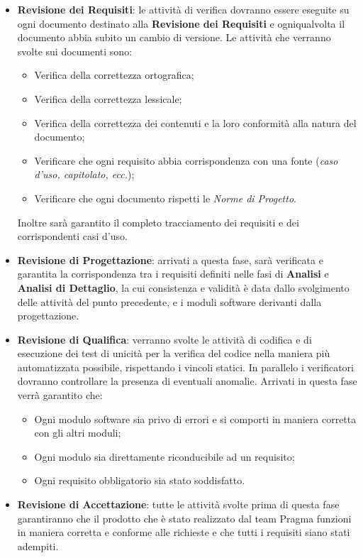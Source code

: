 \begin{itemize}
\item \textbf{Revisione dei Requisiti}: le attività di verifica dovranno essere eseguite su ogni documento destinato alla \textbf{Revisione dei Requisiti} e ogniqualvolta il documento abbia subito un cambio di versione. Le attività che verranno svolte sui documenti sono:
\begin{itemize}
\item[\-] Verifica della correttezza ortografica;
\item[\-] Verifica della correttezza lessicale;
\item[\-] Verifica della correttezza dei contenuti e la loro conformità alla natura del documento;
\item[\-] Verificare che ogni requisito abbia corrispondenza con una fonte (\textit{caso d’uso, capitolato, ecc.});
\item[\-] Verificare che ogni documento rispetti le \textit{Norme di Progetto}.
\end{itemize}
Inoltre sarà garantito il completo tracciamento dei requisiti e dei corrispondenti casi d’uso.
\item \textbf{Revisione di Progettazione}: arrivati a questa fase, sarà verificata e garantita la corrispondenza tra i requisiti definiti nelle fasi di \textbf{Analisi} e \textbf{Analisi di Dettaglio}, la cui consistenza e validità è data dallo svolgimento delle attività del punto precedente, e i moduli software derivanti dalla progettazione.
\item \textbf{Revisione di Qualifica}: verranno svolte le attività di codifica e di esecuzione dei test di unicità per la verifica del codice nella maniera più automatizzata possibile, rispettando i vincoli statici. In parallelo i verificatori dovranno controllare la presenza di eventuali anomalie. Arrivati in questa fase verrà garantito che:
\begin{itemize}
\item[\-] Ogni modulo software sia privo di errori e si comporti in maniera corretta con gli altri moduli;
\item[\-] Ogni modulo sia direttamente riconducibile ad un requisito;
\item[\-] Ogni requisito obbligatorio sia stato soddisfatto.
\end{itemize}
\item \textbf{Revisione di Accettazione}: tutte le attività svolte prima di questa fase garantiranno che il prodotto che è stato realizzato dal team Pragma funzioni in maniera corretta e conforme alle richieste e che tutti i requisiti siano stati adempiti.
\end{itemize}


